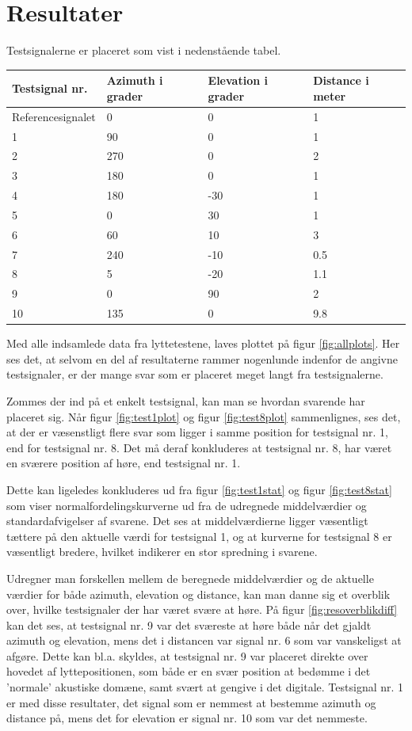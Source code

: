 \section{Resultater}

Testsignalerne er placeret som vist i nedenstående tabel.

\begin{tabular}{p{3.2cm}|p{2.3cm}|p{2.3cm}|p{2.3cm}}
	Testsignal nr. & Azimuth i grader & Elevation i grader & Distance i meter \\\hline
	Referencesignalet & 0 & 0 & 1 \\
	1 &90&0&1 \\
	2 &270&0&2 \\
	3 &180&0&1 \\
	4 &180&-30&1 \\
	5 &0&30&1 \\
	6 &60&10&3 \\
	7 &240&-10&0.5 \\
	8 &5&-20&1.1 \\
	9 &0&90&2 \\
	10 &135&0&9.8 \\
\end{tabular}

Med alle indsamlede data fra lyttetestene, laves plottet på figur \ref{fig:allplots}. Her ses det, at selvom en del af resultaterne rammer nogenlunde indenfor de angivne testsignaler, er der mange svar som er placeret meget langt fra testsignalerne. 

Zommes der ind på et enkelt testsignal, kan man se hvordan svarende har placeret sig. Når figur \ref{fig:test1plot} og figur \ref{fig:test8plot} sammenlignes, ses det, at der er væsenstligt flere svar som ligger i samme position for testsignal nr. 1, end for testsignal nr. 8. Det må deraf konkluderes at testsignal nr. 8, har været en sværere position af høre, end testsignal nr. 1.

Dette kan ligeledes konkluderes ud fra figur \ref{fig:test1stat} og figur \ref{fig:test8stat} som viser normalfordelingskurverne ud fra de udregnede middelværdier og standardafvigelser af svarene. Det ses at middelværdierne ligger væsentligt tættere på den aktuelle værdi for testsignal 1, og at kurverne for testsignal 8 er væsentligt bredere, hvilket indikerer en stor spredning i svarene. 

Udregner man forskellen mellem de beregnede middelværdier og de aktuelle værdier for både azimuth, elevation og distance, kan man danne sig et overblik over, hvilke testsignaler der har været svære at høre. På figur \ref{fig:resoverblikdiff} kan det ses, at testsignal nr. 9 var det sværeste at høre både når det gjaldt azimuth og elevation, mens det i distancen var signal nr. 6 som var vanskeligst at afgøre. Dette kan bl.a. skyldes, at testsignal nr. 9 var placeret direkte over hovedet af lyttepositionen, som både er en svær position at bedømme i det 'normale' akustiske domæne, samt svært at gengive i det digitale. 
Testsignal nr. 1 er med disse resultater, det signal som er nemmest at bestemme azimuth og distance på, mens det for elevation er signal nr. 10 som var det nemmeste.

